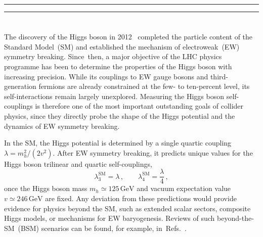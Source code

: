 \documentclass{SciPost}
\def\beq{\begin{equation}}
\def\eeq{\end{equation}}
\begin{document}


\newpage

\vspace{10pt}
\noindent\rule{\textwidth}{1pt}
\tableofcontents
\noindent\rule{\textwidth}{1pt}
\vspace{10pt}

\allowdisplaybreaks

\section{\textbf{}}
\label{sec:introduction}

The discovery of the Higgs boson in 2012~\cite{ATLAS:2012yve,CMS:2012qbp} completed the particle content of the Standard Model~(SM) and established the mechanism of electroweak~(EW) symmetry breaking. Since~then, a major objective of the LHC physics programme has been to determine the properties of the Higgs boson with increasing precision. While its couplings to EW gauge bosons and third-generation fermions are already constrained at the few- to ten-percent level, its self-interactions remain largely unexplored. Measuring the Higgs boson self-couplings is therefore one of the most important outstanding goals of collider physics, since they directly probe the shape of the Higgs potential and the dynamics of EW symmetry breaking.

In the SM, the Higgs potential is determined by a single quartic coupling $\lambda = m_h^2/(2v^2)$. After EW symmetry breaking, it predicts unique values for the Higgs boson trilinear and quartic self-couplings,
\beq \label{eq:SM67}
\lambda_3^{\mathrm{SM}} = \lambda \,, \qquad
\lambda_4^{\mathrm{SM}} = \frac{\lambda}{4} \,,
\eeq
once the Higgs boson mass $m_h\simeq125\,\mathrm{GeV}$ and vacuum expectation value $v\simeq246\,\mathrm{GeV}$ are fixed. Any deviation from these predictions would provide evidence for physics beyond the SM, such as extended scalar sectors, composite Higgs models, or mechanisms for EW baryogenesis. Reviews of such beyond-the-SM~(BSM) scenarios can be found, for example, in~Refs.~\cite{DiMicco:2019ngk,Durieux:2022hbu}.
\end{document}
